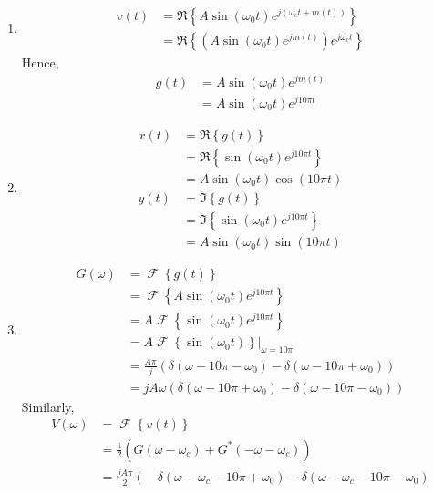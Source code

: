 \documentclass[titlepage, fleqn, a4paper, 12pt, twoside]{article}
\theoremstyle{definition}
\theoremstyle{theorem}
\DeclareMathOperator{\FT}{\mathcal{F}}
\begin{document}
\begin{solution}
	\begin{enumerate}
		\item
			\begin{align*}
				v(t) &= \Re\left\{ A \sin(\omega_0 t) e^{j \left( \omega_c t + m(t) \right)} \right\}\\
				&= \Re\left\{ \left( A \sin(\omega_0 t) e^{j m(t)} \right) e^{j \omega_c t} \right\}
			\end{align*}
			Hence,
			\begin{align*}
				g(t) &= A \sin(\omega_0 t) e^{j m(t)}\\
				&= A \sin(\omega_0 t) e^{j 10 \pi t}
			\end{align*}
		\item
			\begin{align*}
				x(t) &= \Re\left\{ g(t) \right\}\\
				&= \Re\left\{ \sin(\omega_0 t) e^{j 10 \pi t} \right\}\\
				&= A \sin(\omega_0 t) \cos(10 \pi t)\\
				y(t) &= \Im\left\{ g(t) \right\}\\
				&= \Im\left\{ \sin(\omega_0 t) e^{j 10 \pi t} \right\}\\
				&= A \sin(\omega_0 t) \sin(10 \pi t)
			\end{align*}
		\item
			\begin{align*}
				G(\omega) &= \FT\left\{ g(t) \right\}\\
				&= \FT\left\{ A \sin(\omega_0 t) e^{j 10 \pi t} \right\}\\
				&= A \FT\left\{ \sin(\omega_0 t) e^{j 10 \pi t} \right\}\\
				&= A \FT\left\{ \sin(\omega_0 t) \right\} \Big|_{\omega = 10 \pi}\\
				&= \frac{A \pi}{j} \left( \delta(\omega - 10 \pi - \omega_0) - \delta(\omega - 10 \pi + \omega_0) \right)\\
				&= j A \omega \left( \delta(\omega - 10 \pi + \omega_0) - \delta(\omega - 10 \pi - \omega_0) \right)
			\end{align*}
			Similarly,
			\begin{align*}
				V(\omega) &= \FT\left\{ v(t) \right\}\\
				&= \frac{1}{2} \left( G(\omega - \omega_c) + G^*(-\omega - \omega_c) \right)\\
				&= \frac{j A \pi}{2} \left( \quad \delta(\omega - \omega_c - 10 \pi + \omega_0) - \delta(\omega - \omega_c - 10 \pi - \omega_0) \right.\\

\end{align*}
\end{enumerate}
\end{solution}
\end{document}
